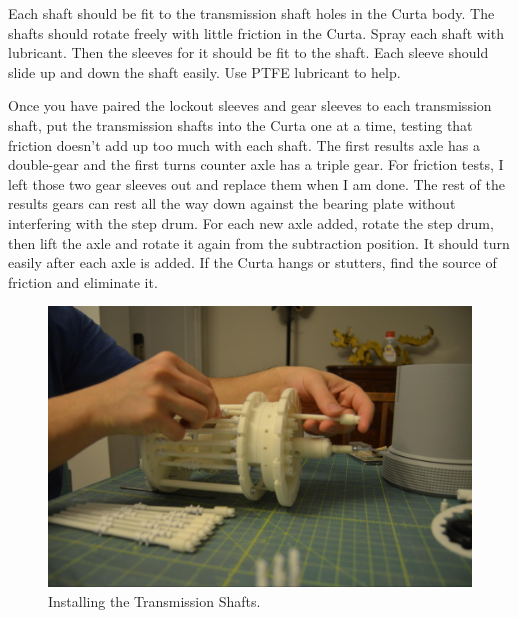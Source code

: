 \documentclass[openany]{book}
\begin{document}





Each shaft should be fit to the transmission shaft holes in the Curta body. The shafts should rotate freely with little friction in the Curta. Spray each shaft with lubricant. Then the sleeves for it should be fit to the shaft. Each sleeve should slide up and down the shaft easily. Use PTFE lubricant to help.





Once you have paired the lockout sleeves and gear sleeves to each transmission shaft, put the transmission shafts into the Curta one at a time, testing that friction doesn't add up too much with each shaft. The first results axle has a double-gear and the first turns counter axle has a triple gear. For friction tests, I left those two gear sleeves out and replace them when I am done. The rest of the results gears can rest all the way down against the bearing plate without interfering with the step drum. For each new axle added, rotate the step drum, then lift the axle and rotate it again from the subtraction position. It should turn easily after each axle is added. If the Curta hangs or stutters, find the source of friction and eliminate it.

\begin{figure}[!ht]
	\centering
	\includegraphics[width=.75\textwidth]{images/image50.jpg}
	\caption{Installing the Transmission Shafts.}
	\label{fig:image50}	
\end{figure}
\end{document}
